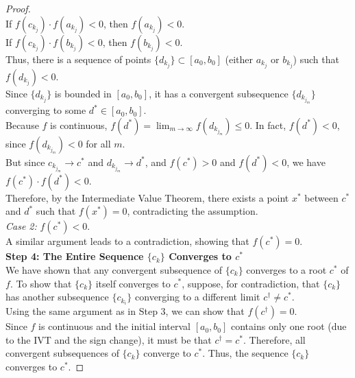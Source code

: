 \documentclass{article}
\begin{document}
\begin{proof}
\\
If \( f(c_{k_j}) \cdot f(a_{k_j}) < 0 \), then \( f(a_{k_j}) < 0 \).
\\
If \( f(c_{k_j}) \cdot f(b_{k_j}) < 0 \), then \( f(b_{k_j}) < 0 \).
\\
Thus, there is a sequence of points \( \{ d_{k_j} \} \subset [a_0, b_0] \) (either \( a_{k_j} \) or \( b_{k_j} \)) such that \( f(d_{k_j}) < 0 \).
\\
Since \( \{ d_{k_j} \} \) is bounded in \( [a_0, b_0] \), it has a convergent subsequence \( \{ d_{k_{j_m}} \} \) converging to some \( d^\ast \in [a_0, b_0] \).
\\
Because \( f \) is continuous, \( f(d^\ast) = \lim_{m \to \infty} f(d_{k_{j_m}}) \leq 0 \). In fact, \( f(d^\ast) < 0 \), since \( f(d_{k_{j_m}}) < 0 \) for all \( m \).
\\
But since \( c_{k_{j_m}} \to c^\ast \) and \( d_{k_{j_m}} \to d^\ast \), and \( f(c^\ast) > 0 \) and \( f(d^\ast) < 0 \), we have \( f(c^\ast) \cdot f(d^\ast) < 0 \).
\\
Therefore, by the Intermediate Value Theorem, there exists a point \( x^\ast \) between \( c^\ast \) and \( d^\ast \) such that \( f(x^\ast) = 0 \), contradicting the assumption.
\\
\textit{Case 2:} \( f(c^\ast) < 0 \).
\\
A similar argument leads to a contradiction, showing that \( f(c^\ast) = 0 \).
\\
\textbf{Step 4: The Entire Sequence \( \{ c_k \} \) Converges to \( c^\ast \)}
\\
We have shown that any convergent subsequence of \( \{ c_k \} \) converges to a root \( c^\ast \) of \( f \). To show that \( \{ c_k \} \) itself converges to \( c^\ast \), suppose, for contradiction, that \( \{ c_k \} \) has another subsequence \( \{ c_{k_i} \} \) converging to a different limit \( c^\dagger \neq c^\ast \).
\\
Using the same argument as in Step 3, we can show that \( f(c^\dagger) = 0 \).
\\
Since \( f \) is continuous and the initial interval \( [a_0, b_0] \) contains only one root (due to the IVT and the sign change), it must be that \( c^\dagger = c^\ast \). Therefore, all convergent subsequences of \( \{ c_k \} \) converge to \( c^\ast \). Thus, the sequence \( \{ c_k \} \) converges to \( c^\ast \).

\end{proof}
\end{document}
